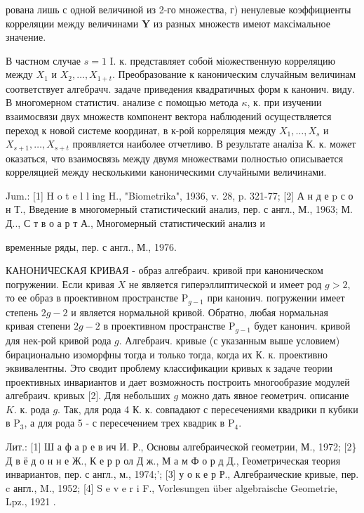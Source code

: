 \documentclass[10pt]{article}
\begin{document}
рована лишь с одной величиной из 2-го множества, г) ненулевые коэффициенты корреляции между величинами $\boldsymbol{Y}$ из разных множеств имеют максімальное значение.



В частном случае $s=1$ I. к. представляет собой міожественную корреляцию между $X_{1}$ и $X_{2}, \ldots, X_{1+t}$. Преобразование к каноническим случайным величинам соответствует алгебрачч. задаче приведения квадратичных форм к канонич. виду. В многомерном статистич. анализе с помощью метода $\kappa$, к. при изучении взаимосвязи двух множеств компонент вектора наблюдений осуществляется переход к новой системе координат, в к-рой корреляция между $X_{1}, \ldots, X_{s}$ и $X_{s+1}, \ldots, X_{s+t}$ проявляется наиболее отчетливо. В результате аналіза К. к. может оказаться, что взаимосвязь между двумя множествами полностью описывается корреляцией между несколькими каноническими случайными величинами.



Jum.: [1] H o t e l l ing H., "Biometrika", 1936, v. 28, p. 321-77; [2] А н д е p с о н Т., Введение в многомерный статистический анализ, пер. с англ., М., 1963; М. Д.., С т в о а р т А., Многомерный статистический анализ и

временные ряды, пер. с англ., М., 1976.



КАНОНИЧЕСКАЯ КРИВАЯ - образ алгебраич. кривой при каноническом погружении. Если кривая $X$ не является гиперэллиптической и имеет род $g>2$, то ее образ в проективном пространстве $\mathrm{P}_{g-1}$ при канонич. погружении имеет степень $2 g-2$ и является нормальной кривой. Обратно, любая нормальная кривая степени $2 g-2$ в проективном пространстве $\mathrm{P}_{g-1}$ будет канонич. кривой для нек-рой кривой рода $g$. Алгебраич. кривые (с указанным выше условием) бирационально изоморфны тогда и только тогда, когда их К. к. проективно эквивалентны. Это сводит проблему классификации кривых к задаче теории проективных инвариантов и дает возможность построить многообразие модулей алгебраич. кривых [2]. Для небольших $g$ можно дать явное геометрич. описание $K$. к. рода $g$. Так, для рода 4 К. к. совпадают с пересечениями квадрики п кубики в $\mathrm{P}_{3}$, а для рода 5 - с пересечением трех квадрик в $\mathrm{P}_{4}$.



Лит.: [1] Ш а ф а р е в ич И. Р., Основы алгебраической геометрии, М., 1972; [2\} Д в ё д о н н е Ж., К е р р ол Д ж., М а м Ф о р д Д., Геометрическая теория инвариантов, пер. с англ., м., 1974;'; [3] у о к е р Р., Алгебраические кривые, пер. c англ., M., 1952; [4] S e v e r i F., Vorlesungen über algebraische Geometrie, Lpz., 1921 .
\end{document}
